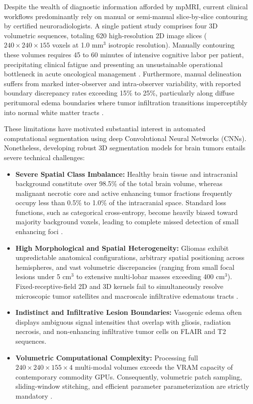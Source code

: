 \documentclass[conference]{IEEEtran}
\begin{document}
Despite the wealth of diagnostic information afforded by mpMRI, current clinical workflows predominantly rely on manual or semi-manual slice-by-slice contouring by certified neuroradiologists. A single patient study comprises four 3D volumetric sequences, totaling 620 high-resolution 2D image slices ($240 \times 240 \times 155$ voxels at 1.0 mm$^3$ isotropic resolution). Manually contouring these volumes requires 45 to 60 minutes of intensive cognitive labor per patient, precipitating clinical fatigue and presenting an unsustainable operational bottleneck in acute oncological management \cite{kleesiek2016deep}. Furthermore, manual delineation suffers from marked inter-observer and intra-observer variability, with reported boundary discrepancy rates exceeding 15\% to 25\%, particularly along diffuse peritumoral edema boundaries where tumor infiltration transitions imperceptibly into normal white matter tracts \cite{mazzara2004brain}.

These limitations have motivated substantial interest in automated computational segmentation using deep Convolutional Neural Networks (CNNs). Nonetheless, developing robust 3D segmentation models for brain tumors entails severe technical challenges:
\begin{itemize}
    \item \textbf{Severe Spatial Class Imbalance:} Healthy brain tissue and intracranial background constitute over 98.5\% of the total brain volume, whereas malignant necrotic core and active enhancing tumor fractions frequently occupy less than 0.5\% to 1.0\% of the intracranial space. Standard loss functions, such as categorical cross-entropy, become heavily biased toward majority background voxels, leading to complete missed detection of small enhancing foci \cite{sudre2017generalised}.
    \item \textbf{High Morphological and Spatial Heterogeneity:} Gliomas exhibit unpredictable anatomical configurations, arbitrary spatial positioning across hemispheres, and vast volumetric discrepancies (ranging from small focal lesions under 5 cm$^3$ to extensive multi-lobar masses exceeding 400 cm$^3$). Fixed-receptive-field 2D and 3D kernels fail to simultaneously resolve microscopic tumor satellites and macroscale infiltrative edematous tracts \cite{litjens2017survey}.
    \item \textbf{Indistinct and Infiltrative Lesion Boundaries:} Vasogenic edema often displays ambiguous signal intensities that overlap with gliosis, radiation necrosis, and non-enhancing infiltrative tumor cells on FLAIR and T2 sequences.
    \item \textbf{Volumetric Computational Complexity:} Processing full $240 \times 240 \times 155 \times 4$ multi-modal volumes exceeds the VRAM capacity of contemporary commodity GPUs. Consequently, volumetric patch sampling, sliding-window stitching, and efficient parameter parameterization are strictly mandatory \cite{bakas2018identifying}.
\end{itemize}
\end{document}
